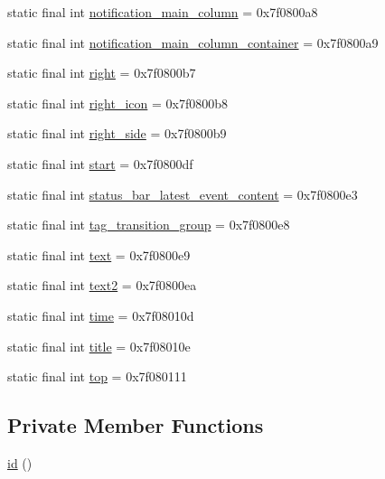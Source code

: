 \begin{DoxyCompactItemize}
static final int \mbox{\hyperlink{classcom_1_1jjoe64_1_1graphview_1_1_r_1_1id_a72bedca8ca6563404af280e15fcbd2ea}{notification\+\_\+main\+\_\+column}} = 0x7f0800a8
\item 
static final int \mbox{\hyperlink{classcom_1_1jjoe64_1_1graphview_1_1_r_1_1id_a2ddc64536454c41b6ff689ad255afba2}{notification\+\_\+main\+\_\+column\+\_\+container}} = 0x7f0800a9
\item 
static final int \mbox{\hyperlink{classcom_1_1jjoe64_1_1graphview_1_1_r_1_1id_ac7186ed882b6a05a4551a6e400df63bf}{right}} = 0x7f0800b7
\item 
static final int \mbox{\hyperlink{classcom_1_1jjoe64_1_1graphview_1_1_r_1_1id_a14e667a5473dc07007a0d3cd1a71e489}{right\+\_\+icon}} = 0x7f0800b8
\item 
static final int \mbox{\hyperlink{classcom_1_1jjoe64_1_1graphview_1_1_r_1_1id_a52539876948f10692535f7e09bb716fa}{right\+\_\+side}} = 0x7f0800b9
\item 
static final int \mbox{\hyperlink{classcom_1_1jjoe64_1_1graphview_1_1_r_1_1id_addd3ab2faa8fb412331df3854c1b5a48}{start}} = 0x7f0800df
\item 
static final int \mbox{\hyperlink{classcom_1_1jjoe64_1_1graphview_1_1_r_1_1id_afa8af09c128eaef60865cbdb0acda5de}{status\+\_\+bar\+\_\+latest\+\_\+event\+\_\+content}} = 0x7f0800e3
\item 
static final int \mbox{\hyperlink{classcom_1_1jjoe64_1_1graphview_1_1_r_1_1id_a1c1d92f744170c742c99bbcc0a86b55d}{tag\+\_\+transition\+\_\+group}} = 0x7f0800e8
\item 
static final int \mbox{\hyperlink{classcom_1_1jjoe64_1_1graphview_1_1_r_1_1id_ac0b28fbd8db1383515911769eb114189}{text}} = 0x7f0800e9
\item 
static final int \mbox{\hyperlink{classcom_1_1jjoe64_1_1graphview_1_1_r_1_1id_a5079984fd9fb5850ad5ec7c44f83c349}{text2}} = 0x7f0800ea
\item 
static final int \mbox{\hyperlink{classcom_1_1jjoe64_1_1graphview_1_1_r_1_1id_ab68184b53bae3b235ec66224a93d5d07}{time}} = 0x7f08010d
\item 
static final int \mbox{\hyperlink{classcom_1_1jjoe64_1_1graphview_1_1_r_1_1id_a17397bd8c370ede9d4f219ec013dd78e}{title}} = 0x7f08010e
\item 
static final int \mbox{\hyperlink{classcom_1_1jjoe64_1_1graphview_1_1_r_1_1id_ad99b3597dff3c7e3509265fbf6333241}{top}} = 0x7f080111
\end{DoxyCompactItemize}
\subsection*{Private Member Functions}
\begin{DoxyCompactItemize}
\item 
\mbox{\hyperlink{classcom_1_1jjoe64_1_1graphview_1_1_r_1_1id_a8f17eca8851fc4a446a195c4c056beb2}{id}} ()
\end{DoxyCompactItemize}


